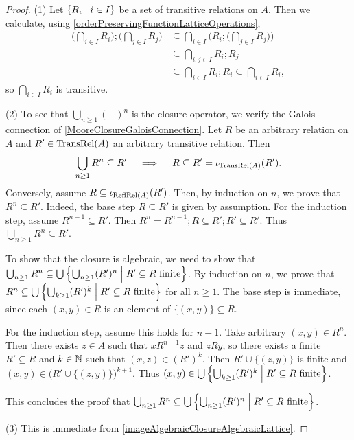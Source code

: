 \begin{proof}
(1) Let $\setbuilder{R_i}{i\in I}$ be a set of transitive relations on $A$. Then we calculate, using \ref{orderPreservingFunctionLatticeOperations},
\begin{align*}
\Big(\bigcap_{i\in I}R_i\Big); \Big(\bigcap_{j\in I}R_j\Big) &\subseteq \bigcap_{i\in I} \bigg(R_i;\Big(\bigcap_{j\in I}R_j\Big)\bigg) \\
&\subseteq \bigcap_{i,j\in I}R_i;R_j \\
&\subseteq \bigcap_{i\in I}R_i;R_i \subseteq \bigcap_{i\in I}R_i, 
\end{align*}
so $\bigcap_{i\in I}R_i$ is transitive.

(2) To see that $\bigcup_{n\geq 1}(-)^n$ is the closure operator, we verify the Galois connection of \ref{MooreClosureGaloisConnection}. Let $R$ be an arbitrary relation on $A$ and $R'\in \operatorname{TransRel}(A)$ an arbitrary transitive relation. Then
\[ \bigcup_{n\geq 1}R^n \subseteq R' \quad\implies\quad R\subseteq R' = \operatorname{\iota}_{\operatorname{TransRel}(A)}(R'). \]
Conversely, assume $R \subseteq \operatorname{\iota}_{\operatorname{ReflRel}(A)}(R')$. Then, by induction on $n$, we prove that $R^n \subseteq R'$. Indeed, the base step $R\subseteq R'$ is given by assumption. For the induction step, assume $R^{n-1} \subseteq R'$. Then $R^n = R^{n-1};R \subseteq R';R' \subseteq R'$. Thus $\bigcup_{n\geq 1}R^n \subseteq R'$.

To show that the closure is algebraic, we need to show that $\bigcup_{n\geq 1}R^n \subseteq \bigcup\setbuilder{\bigcup_{n\geq 1}(R')^n}{\text{$R'\subseteq R$ finite}}$. By induction on $n$, we prove that $R^n \subseteq \bigcup\setbuilder{\bigcup_{k\geq 1}(R')^k}{\text{$R'\subseteq R$ finite}}$ for all $n\geq 1$. The base step is immediate, since each $(x,y)\in R$ is an element of $\{(x,y)\}\subseteq R$.

For the induction step, assume this holds for $n-1$. Take arbitrary $(x,y)\in R^n$. Then there exists $z\in A$ such that $xR^{n-1}z$ and $zRy$, so there exists a finite $R'\subseteq R$ and $k\in \mathbb{N}$ such that $(x,z) \in (R')^k$. Then $R'\cup\{(z,y)\}$ is finite and $(x,y)\in \big(R'\cup\{(z,y)\}\big)^{k+1}$. Thus $(x,y) \in \bigcup\setbuilder{\bigcup_{k\geq 1}(R')^k}{\text{$R'\subseteq R$ finite}}$.

This concludes the proof that $\bigcup_{n\geq 1}R^n \subseteq \bigcup\setbuilder{\bigcup_{n\geq 1}(R')^n}{\text{$R'\subseteq R$ finite}}$.

(3) This is immediate from \ref{imageAlgebraicClosureAlgebraicLattice}.
\end{proof}

